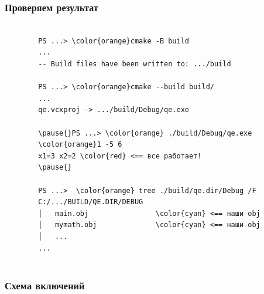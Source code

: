\documentclass[9pt, aspectratio=1610]{beamer}
\begin{document}
\begin{frame}[fragile]\frametitle{Проверяем результат}
	
	\begin{Verbatim}[bgcolor=black,tabsize=4,formatcom=\color{white},gobble=2,fontsize=\small, commandchars=\\\{\}, xleftmargin=0em, frame=single,framerule=0pt ,rulecolor=\color{red},framesep=1em,fillcolor=\color{black}]
		
		PS ...> \color{orange}cmake -B build
		...
		-- Build files have been written to: .../build
		
		PS ...> \color{orange}cmake --build build/
		...
		qe.vcxproj -> .../build/Debug/qe.exe
		
		\pause{}PS ...> \color{orange} ./build/Debug/qe.exe
		\color{orange}1 -5 6
		x1=3 x2=2 \color{red} <== все работает! 
		\pause{}
		
		PS ...>  \color{orange} tree ./build/qe.dir/Debug /F
		C:/.../BUILD/QE.DIR/DEBUG
		│   main.obj  				\color{cyan} <== наши obj
		│   mymath.obj              \color{cyan} <== наши obj
		│   ...
		...
		
	\end{Verbatim}
	
\end{frame}

\begin{frame}  \frametitle{Схема включений}
	\centering
	
\end{frame}
\end{document}
